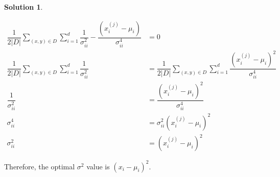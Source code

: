 \documentclass[letterpaper, 12pt]{article}
\newtheorem{problem}{Problem}
\theoremstyle{definition}
\newtheorem*{solution}{Solution}
\begin{document}
\begin{solution}
\begin{enumerate}[1.]
\begin{enumerate}[(a)]

\begin{equation*}
\begin{split}
	\dfrac{1}{2|D|} \sum_{(x,y) \in D} \sum_{i=1}^{d} \dfrac{1}{\sigma_{ii}^{2}} - \dfrac{(x_{i}^{(j)} - \mu_{i})}{\sigma_{ii}^{4}} & = 0 \\
    \dfrac{1}{2|D|} \sum_{(x,y) \in D} \sum_{i=1}^{d} \dfrac{1}{\sigma_{ii}^{2}} & = \dfrac{1}{2|D|} \sum_{(x,y) \in D} \sum_{i=1}^{d} \dfrac{(x_{i}^{(j)} - \mu_{i})^{2}}{\sigma_{ii}^{4}} \\
    \dfrac{1}{\sigma_{ii}^{2}} & = \dfrac{(x_{i}^{(j)} - \mu_{i})^{2}}{\sigma_{ii}^{4}} \\
    \sigma_{ii}^{4} & = \sigma_{ii}^{2}(x_{i}^{(j)} - \mu_{i})^{2} \\
    \sigma_{ii}^{2} & = (x_{i}^{(j)} - \mu_{i})^{2}
\end{split}
\end{equation*}

Therefore, the optimal $\sigma^{2}$ value is $(x_{i} - \mu_{i})^{2}$.


    \end{enumerate}
       \end{enumerate}
\end{solution}


\end{document}
